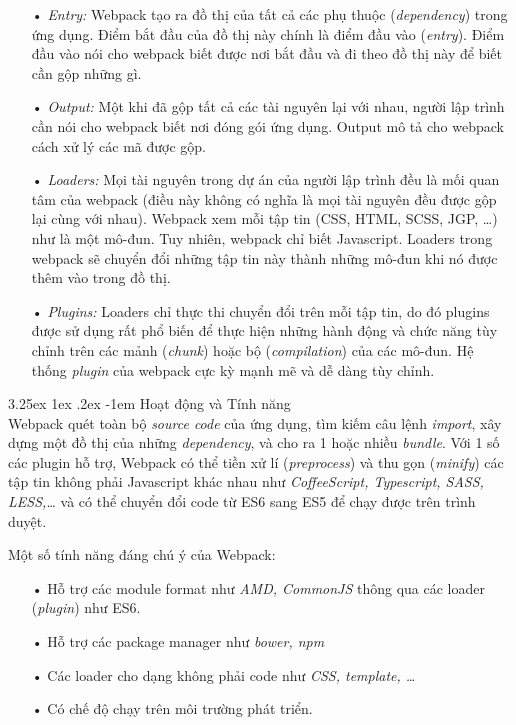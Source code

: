 \documentclass[12pt,a4paper]{article}
\makeatletter
\newcommand{\myparagraph}[1]{\paragraph{#1}\mbox{}\\} %
\renewcommand\paragraph{\@startsection{paragraph}{5}{\z@}%
  {3.25ex \@plus1ex \@minus.2ex}%
  {-1em}%
  {\normalfont\normalsize\bfseries}}
\makeatother
\begin{document}
\begin{itemize}
\item[•] \emph{Entry:} Webpack tạo ra đồ thị của tất cả các phụ thuộc (\textit{dependency}) trong ứng dụng. Điểm bắt đầu của đồ thị này chính là điểm đầu vào (\textit{entry}). Điểm đầu vào nói cho webpack biết được nơi bắt đầu và đi theo đồ thị này để biết cần gộp những gì.
\item[•] \emph{Output:} Một khi đã gộp tất cả các tài nguyên lại với nhau, người lập trình cần nói cho webpack biết nơi đóng gói ứng dụng. Output mô tả cho webpack cách xử lý các mã được gộp.
\item[•] \emph{Loaders:} Mọi tài nguyên trong dự án của người lập trình đều là mối quan tâm của webpack (điều này không có nghĩa là mọi tài nguyên đều được gộp lại cùng với nhau). Webpack xem mỗi tập tin (CSS, HTML, SCSS, JGP, …) như là một mô-đun. Tuy nhiên, webpack chỉ biết Javascript. Loaders trong webpack sẽ chuyển đổi những tập tin này thành những mô-đun khi nó được thêm vào trong đồ thị.
\item[•] \emph{Plugins:} Loaders chỉ thực thi chuyển đổi trên mỗi tập tin, do đó plugins được sử dụng rất phổ biến để thực hiện những hành động và chức năng tùy chỉnh trên các mảnh (\textit{chunk}) hoặc bộ (\textit{compilation}) của các mô-đun. Hệ thống \textit{plugin} của webpack cực kỳ mạnh mẽ và dễ dàng tùy chỉnh.
\end{itemize}

\myparagraph{Hoạt động và Tính năng}
Webpack quét toàn bộ \textit{source code} của ứng dụng, tìm kiếm câu lệnh \textit{import}, xây dựng một đồ thị của những \textit{dependency}, và cho ra 1 hoặc nhiều \textit{bundle}. Với 1 số các plugin hỗ trợ, Webpack có thể tiền xử lí (\textit{preprocess}) và thu gọn (\textit{minify}) các tập tin không phải Javascript khác nhau như \textit{CoffeeScript, Typescript, SASS, LESS,…} và có thể chuyển đổi code từ ES6 sang ES5 để chạy được trên trình duyệt.

Một số tính năng đáng chú ý của Webpack:
\begin{itemize}
\item[•] Hỗ trợ các module format như \textit{AMD, CommonJS} thông qua các loader (\textit{plugin}) như ES6.
\item[•] Hỗ trợ các package manager như \textit{bower, npm}
\item[•] Các loader cho dạng không phải code như \textit{CSS, template, …}
\item[•] Có chế độ chạy trên môi trường phát triển.
\end{itemize}
\end{document}
